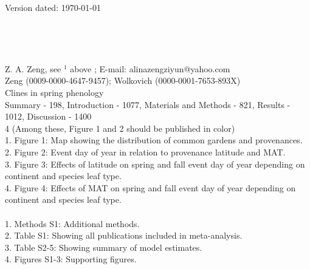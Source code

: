 \documentclass[12pt]{article}
\begin{document}
\begin{flushright}
Version dated: \today
\end{flushright}

\bigskip
\medskip
\begin{center}

\\ 
\bigskip

\\


\end{center}
\medskip
{} Z. A. Zeng, see $^{1}$ above ; E-mail: alinazengziyun@yahoo.com\\
 Zeng (0009-0000-4647-9457); Wolkovich (0000-0001-7653-893X)\\
 Clines in spring phenology\\
 Summary - 198, Introduction - 1077, Materials and Methods - 821, Results - 1012, Discussion - 1400\\
 4 (Among these, Figure 1 and 2 should be published in color)\\
1. Figure 1: Map showing the distribution of common gardens and provenances.\\
2. Figure 2: Event day of year in relation to provenance latitude and MAT.\\
3. Figure 3: Effects of latitude on spring and fall event day of year depending on continent and species leaf type.\\
4. Figure 4: Effects of MAT on spring and fall event day of year depending on continent and species leaf type.\\
\\
1. Methods S1: Additional methods.\\
2. Table S1: Showing all publications included in meta-analysis.\\
3. Table S2-5: Showing summary of model estimates.\\
4. Figures S1-3: Supporting figures.
\end{document}
